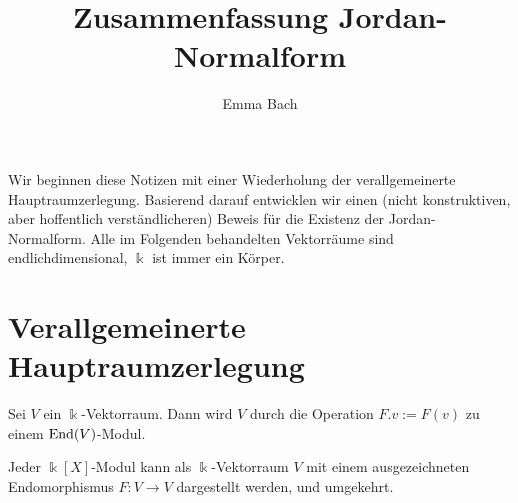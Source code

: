 \documentclass[10pt]{article}
\begin{document}
	\title{\Huge\vspace{-1.5cm}\textbf{Zusammenfassung Jordan-Normalform}}
	\author{Emma Bach}
	\maketitle
	
	Wir beginnen diese Notizen mit einer Wiederholung der verallgemeinerte Hauptraumzerlegung. Basierend darauf entwicklen wir einen (nicht konstruktiven, aber hoffentlich verständlicheren) Beweis für die Existenz der Jordan-Normalform. Alle im Folgenden behandelten Vektorräume sind endlichdimensional, $\Bbbk$ ist immer ein Körper.
	
	
	\section{Verallgemeinerte Hauptraumzerlegung}
	\begin{exercise}
		Sei $V$ ein $\Bbbk$-Vektorraum. Dann wird $V$ durch die Operation $F.v := F(v)$ zu einem $\textnormal{End}(V)$-Modul.
	\end{exercise}
	\begin{theorem}
		Jeder $\Bbbk[X]$-Modul kann als $\Bbbk$-Vektorraum $V$ mit einem ausgezeichneten Endomorphismus $F : V \to V$ dargestellt werden, und umgekehrt.
	\end{theorem}
\end{document}

